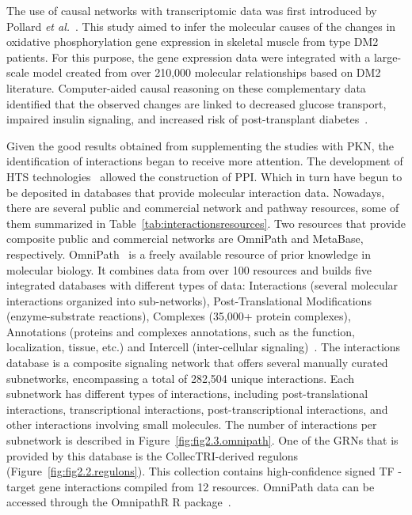 The use of causal networks with transcriptomic data was first introduced by Pollard \textit{et al.}~\cite{RN131, RN135}. This study aimed to infer the molecular causes of the changes in oxidative phosphorylation gene expression in skeletal muscle from type \gls{DM2} patients. For this purpose, the gene expression data were integrated with a large-scale model created from over 210,000 molecular relationships based on \gls{DM2} literature. 
Computer-aided causal reasoning on these complementary data identified that the observed changes are linked to decreased glucose transport, impaired insulin signaling, and increased risk of post-transplant diabetes~\cite{RN131}.

Given the good results obtained from supplementing the studies with \gls{PKN}, the identification of interactions began to receive more attention. 
The development of \gls{HTS} technologies~\cite{RN138} allowed the construction of \gls{PPI}. Which in turn have begun to be deposited in databases that provide molecular interaction data.
Nowadays, there are several public and commercial network and pathway resources, some of them summarized in Table~\ref{tab:interactionsresources}.
Two resources that provide composite public and commercial networks are OmniPath and MetaBase, respectively. OmniPath~\cite{RN91} is a freely available resource of prior knowledge in molecular biology. 
It combines data from over 100 resources and builds five integrated databases with different types of data: Interactions (several molecular interactions organized into sub-networks), Post-Translational Modifications (enzyme-substrate reactions), Complexes (35,000+ protein complexes), Annotations (proteins and complexes annotations, such as the function, localization, tissue, etc.) and Intercell (inter-cellular signaling)~\cite{RN91}. 
The interactions database is a composite signaling network that offers several manually curated subnetworks, encompassing a total of 282,504 unique interactions. 
Each subnetwork has different types of interactions, including post-translational interactions, transcriptional interactions, post-transcriptional interactions, and other interactions involving small molecules. 
The number of interactions per subnetwork is described in Figure~\ref{fig:fig2.3.omnipath}.
One of the GRNs that is provided by this database is the CollecTRI-derived regulons~\cite{RN145} (Figure~\ref{fig:fig2.2.regulons}). 
This collection contains high-confidence signed \gls{TF} - target gene interactions compiled from 12 resources.
OmniPath data can be accessed through the OmnipathR \gls{R} package~\cite{RN92}.

